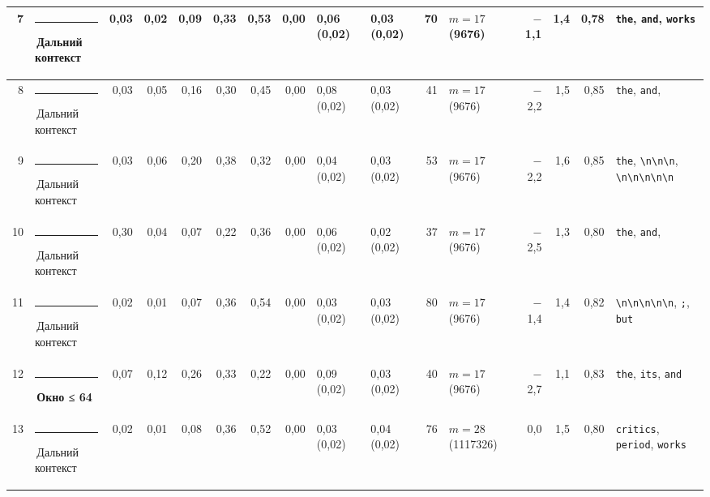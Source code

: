 \documentclass[10pt]{article}
\begin{document}
\begin{minipage}{\linewidth}
\begin{center}
{\begin{tabular}{|r|l|r|r|r|r|r|r|l|l|r|l|r|r|r|l|}
7 & \textcolor[HTML]{C3C2B7}{\rule{0.62em}{0.62em}}\,Дальний контекст & 0,03 & 0,02 & 0,09 & 0,33 & 0,53 & 0,00 & 0,06 (0,02) & 0,03 (0,02) & 70 & $m{=}17$ (9676) & $-$1,1 & 1,4 & 0,78 & \texttt{\textvisiblespace{}the}, \texttt{\textvisiblespace{}and}, \texttt{\textvisiblespace{}works} \\ \hline
8 & \textcolor[HTML]{C3C2B7}{\rule{0.62em}{0.62em}}\,Дальний контекст & 0,03 & 0,05 & 0,16 & 0,30 & 0,45 & 0,00 & 0,08 (0,02) & 0,03 (0,02) & 41 & $m{=}17$ (9676) & $-$2,2 & 1,5 & 0,85 & \texttt{\textvisiblespace{}the}, \texttt{\textvisiblespace{}and}, \texttt{\textvisiblespace{}} \\ \hline
9 & \textcolor[HTML]{C3C2B7}{\rule{0.62em}{0.62em}}\,Дальний контекст & 0,03 & 0,06 & 0,20 & 0,38 & 0,32 & 0,00 & 0,04 (0,02) & 0,03 (0,02) & 53 & $m{=}17$ (9676) & $-$2,2 & 1,6 & 0,85 & \texttt{\textvisiblespace{}the}, \texttt{\textvisiblespace{}\textbackslash{}n\textbackslash{}n\textbackslash{}n}, \texttt{\textbackslash{}n\textbackslash{}n\textbackslash{}n\textbackslash{}n\textbackslash{}n} \\ \hline
10 & \textcolor[HTML]{C3C2B7}{\rule{0.62em}{0.62em}}\,Дальний контекст & 0,30 & 0,04 & 0,07 & 0,22 & 0,36 & 0,00 & 0,06 (0,02) & 0,02 (0,02) & 37 & $m{=}17$ (9676) & $-$2,5 & 1,3 & 0,80 & \texttt{\textvisiblespace{}the}, \texttt{\textvisiblespace{}and}, \texttt{\textvisiblespace{}} \\ \hline
11 & \textcolor[HTML]{C3C2B7}{\rule{0.62em}{0.62em}}\,Дальний контекст & 0,02 & 0,01 & 0,07 & 0,36 & 0,54 & 0,00 & 0,03 (0,02) & 0,03 (0,02) & 80 & $m{=}17$ (9676) & $-$1,4 & 1,4 & 0,82 & \texttt{\textbackslash{}n\textbackslash{}n\textbackslash{}n\textbackslash{}n\textbackslash{}n}, \texttt{\textvisiblespace{};}, \texttt{\textvisiblespace{}but} \\ \hline
12 & \textcolor[HTML]{EDA100}{\rule{0.62em}{0.62em}}\,\textbf{Окно ≤ 64} & 0,07 & 0,12 & 0,26 & 0,33 & 0,22 & 0,00 & 0,09 (0,02) & 0,03 (0,02) & 40 & $m{=}17$ (9676) & $-$2,7 & 1,1 & 0,83 & \texttt{\textvisiblespace{}the}, \texttt{\textvisiblespace{}its}, \texttt{\textvisiblespace{}and} \\ \hline
13 & \textcolor[HTML]{C3C2B7}{\rule{0.62em}{0.62em}}\,Дальний контекст & 0,02 & 0,01 & 0,08 & 0,36 & 0,52 & 0,00 & 0,03 (0,02) & 0,04 (0,02) & 76 & $m{=}28$ (1117326) & 0,0 & 1,5 & 0,80 & \texttt{\textvisiblespace{}critics}, \texttt{\textvisiblespace{}period}, \texttt{\textvisiblespace{}works} \\ \hline
\hline\end{tabular}}\end{center}
\end{minipage}
\end{document}
